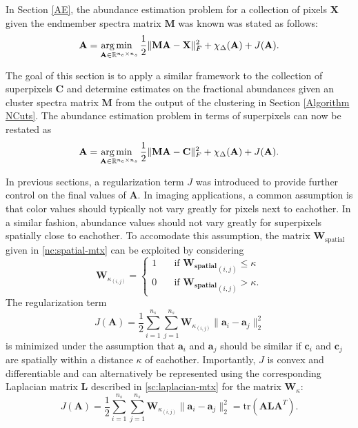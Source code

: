 In Section \ref{AE}, the abundance estimation problem for a collection of pixels $\mathbf{X}$ given the endmember spectra matrix $\mathbf{M}$ was known was stated as follows:
\begin{equation*}
    \mathbf{A} = \operatorname*{arg\,min \;\;}_{\mathbf{A} \in \mathbb{R}^{n_e \times n_s}} \frac{1}{2}\|\mathbf{MA} - \mathbf{X}\|_F^2 + \chi_\Delta(\mathbf{A}) + J(\mathbf{A}).
\end{equation*}

The goal of this section is to apply a similar framework to the collection of superpixels $\mathbf{C}$ and determine estimates on the fractional abundances given an cluster spectra matrix $\mathbf{M}$ from the output of the clustering in Section \ref{Algorithm NCuts}. The abundance estimation problem in terms of superpixels can now be restated as
\begin{equation*}
    \mathbf{A} = \operatorname*{arg\,min \;\;}_{\mathbf{A} \in \mathbb{R}^{n_e \times n_s}} \frac{1}{2}\|\mathbf{MA} - \mathbf{C}\|_F^2 + \chi_\Delta(\mathbf{A}) + J(\mathbf{A}).
\end{equation*}

In previous sections, a regularization term $J$ was introduced to provide further control on the final values of $\mathbf{A}$. In imaging applications, a common assumption is that color values should typically not vary greatly for pixels next to eachother. In a similar fashion, abundance values should not vary greatly for superpixels spatially close to eachother. To accomodate this assumption, the matrix $\mathbf{W}_{\text{spatial}}$ given in \eqref{nc:spatial-mtx} can be exploited by considering
\begin{equation}
    \label{nc:spatial_filter_mtx}
    \mathbf{W}_{{\kappa}_{(i,j)}} = \begin{cases}
        1 &\quad \text{if } \mathbf{W_{\text{spatial}}}_{(i,j)} \leq \kappa\\
        0 &\quad \text{if } \mathbf{W_{\text{spatial}}}_{(i,j)} > \kappa.
    \end{cases}
\end{equation}
The regularization term
\begin{equation*}
    J(\mathbf{A}) = \frac{1}{2}\sum_{i = 1}^{n_s} \sum_{j = 1}^{n_s} \mathbf{W}_{{\kappa}_{(i,j)}} \|\mathbf{a}_i - \mathbf{a}_j\|_2^2
\end{equation*}
is minimized under the assumption that $\mathbf{a}_i$ and $\mathbf{a}_j$ should be similar if $\mathbf{c}_i$ and $\mathbf{c}_j$ are spatially within a distance $\kappa$ of eachother. Importantly, $J$ is convex and differentiable and can alternatively be represented using the corresponding Laplacian matrix $\mathbf{L}$ described in \eqref{sc:laplacian-mtx} for the matrix $\mathbf{W}_{\kappa}$:
\begin{equation}
    \label{unmixing:distance-regularization}
    J(\mathbf{A}) = \frac{1}{2}\sum_{i = 1}^{n_s} \sum_{j = 1}^{n_s} \mathbf{W}_{{\kappa}_{(i,j)}} \|\mathbf{a}_i - \mathbf{a}_j\|_2^2 = \text{tr}(\mathbf{ALA}^T).
\end{equation}

